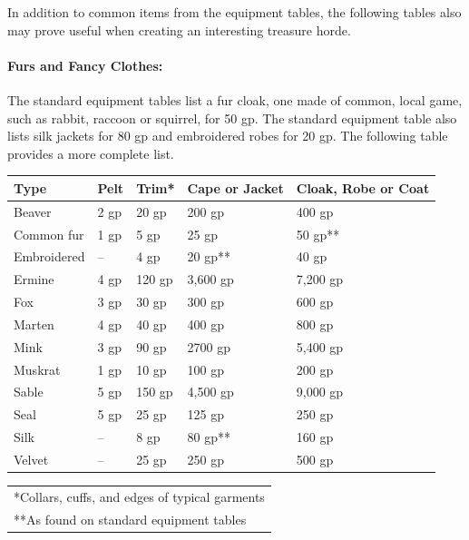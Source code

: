 \begin{multicols}{2}
In addition to common items from the equipment tables, the following tables also may prove useful when creating an interesting treasure horde.  

\paragraph{Furs and Fancy Clothes:} The standard equipment tables list a fur cloak, one made of common, local game, such as rabbit, raccoon or squirrel, for 50 gp.  The standard equipment table also lists silk jackets for 80 gp and embroidered robes for 20 gp. The following table provides a more complete list.

\noindent
\begin{minipage}{\columnwidth}

\label{fursclothes}
\noindent
\begin{tabular}{|m{}|m{}|m{}|m{}|m{}|}
\hline
Type	& Pelt	& Trim*	& Cape or Jacket	& Cloak, Robe or Coat \\
\hline\hline
\rowcolor[gray]{.9}Beaver	& 2 gp	& 20 gp	& 200 gp	& 400 gp \\
Common fur	& 1 gp	& 5 gp	& 25 gp	& 50 gp** \\
\rowcolor[gray]{.9}Embroidered	& --	& 4 gp	& 20 gp**	& 40 gp \\
Ermine	& 4 gp	& 120 gp	& 3,600 gp	& 7,200 gp \\
\rowcolor[gray]{.9}Fox	& 3 gp	& 30 gp	& 300 gp	& 600 gp \\
Marten	& 4 gp	& 40 gp	& 400 gp	& 800 gp \\
\rowcolor[gray]{.9}Mink	& 3 gp	& 90 gp	& 2700 gp	& 5,400 gp \\
Muskrat	& 1 gp	& 10 gp	& 100 gp	& 200 gp \\
\rowcolor[gray]{.9}Sable	& 5 gp	& 150 gp	& 4,500 gp	& 9,000 gp \\
Seal	& 5 gp	& 25 gp	& 125 gp	& 250 gp \\
\rowcolor[gray]{.9}Silk	& --	& 8 gp	& 80 gp**	& 160 gp \\
Velvet	& --	& 25 gp	& 250 gp	& 500 gp \\
\hline
\end{tabular}
\noindent\begin{tabular}{p{}}
*Collars, cuffs, and edges of typical garments \\
**As found on standard equipment tables \\
\end{tabular}\vspace{.5em}


\end{minipage}
\end{multicols}
